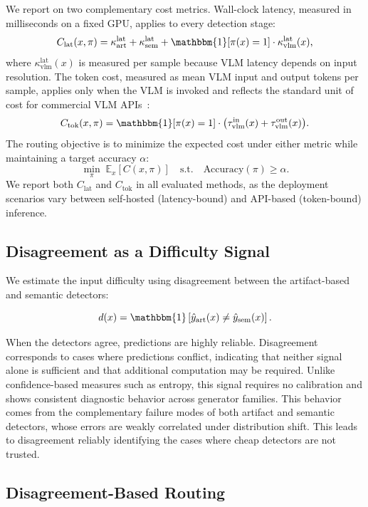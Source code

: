 \documentclass{ieeeaccess}
\begin{document}
We report on two complementary cost metrics. Wall-clock latency, measured in milliseconds on a fixed GPU, applies to every detection stage:
\[
C_{\text{lat}}(x, \pi) = \kappa^{\text{lat}}_{\text{art}} + \kappa^{\text{lat}}_{\text{sem}}
+ \mathbbm{1}[\pi(x)=1] \cdot \kappa^{\text{lat}}_{\text{vlm}}(x),
\]
where $\kappa^{\text{lat}}_{\text{vlm}}(x)$ is measured per sample because VLM latency depends on input resolution. The token cost, measured as mean VLM input and output tokens per sample, applies only when the VLM is invoked and reflects the standard unit of cost for commercial VLM APIs~\cite{chen2024frugalgpt}:
\[
C_{\text{tok}}(x, \pi) = \mathbbm{1}[\pi(x)=1] \cdot \bigl(\tau^{\text{in}}_{\text{vlm}}(x)
+ \tau^{\text{out}}_{\text{vlm}}(x)\bigr).
\]
The routing objective is to minimize the expected cost under either metric while maintaining a target accuracy $\alpha$:
\[
\min_{\pi} \; \mathbb{E}_x[C(x, \pi)] \quad \text{s.t.} \quad \text{Accuracy}(\pi) \geq \alpha.
\]
We report both $C_{\text{lat}}$ and $C_{\text{tok}}$ in all evaluated methods, as the deployment scenarios vary between self-hosted (latency-bound) and API-based (token-bound) inference.

\subsection{Disagreement as a Difficulty Signal}

We estimate the input difficulty using disagreement between the artifact-based and semantic detectors:

\begin{equation}
d(x) = \mathbbm{1}\left[\hat{y}_{\text{art}}(x) \neq \hat{y}_{\text{sem}}(x)\right].
\label{eq:disagree}
\end{equation}

When the detectors agree, predictions are highly reliable. Disagreement corresponds to
cases where predictions conflict, indicating that neither signal alone is sufficient and
that additional computation may be required. Unlike confidence-based measures such as
entropy, this signal requires no calibration and shows consistent diagnostic behavior
across generator families. This behavior comes from the complementary failure modes of
both artifact and semantic detectors, whose errors are weakly correlated under
distribution shift. This leads to disagreement reliably identifying the cases where cheap detectors
are not trusted.


\subsection{Disagreement-Based Routing}
\end{document}
